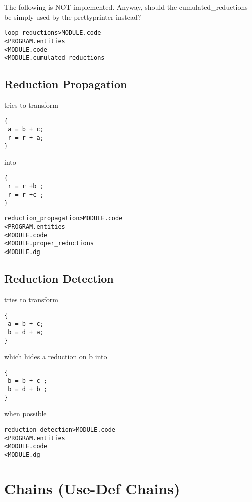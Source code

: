 \documentclass[a4paper]{report}
\newenvironment{PipsMake}{\begin{alltt}}{\end{alltt}}
\newenvironment{PipsPass}[1]{\label{pass:#1}}{}
\begin{document}
The following is NOT implemented. Anyway, should the cumulated\_reductions
be simply used by the prettyprinter instead?
\begin{PipsMake}
loop_reductions > MODULE.code
  < PROGRAM.entities
  < MODULE.code
  < MODULE.cumulated_reductions
\end{PipsMake}


\subsection{Reduction Propagation}
\begin{PipsPass}{reduction_propagation}
 tries to transform
 \begin{lstlisting}
{
 a = b + c;
 r = r + a;
}
 \end{lstlisting}
 into
 \begin{lstlisting}
{
 r = r +b ;
 r = r +c ;
}
 \end{lstlisting}
\end{PipsPass}
\begin{PipsMake}
reduction_propagation > MODULE.code
  < PROGRAM.entities
  < MODULE.code
  < MODULE.proper_reductions
  < MODULE.dg
\end{PipsMake}

\subsection{Reduction Detection}
\begin{PipsPass}{reduction_detection}
 tries to transform
 \begin{lstlisting}
{
 a = b + c;
 b = d + a;
}
 \end{lstlisting}
 which hides a reduction on b
 into
 \begin{lstlisting}
{
 b = b + c ;
 b = d + b ;
}
 \end{lstlisting}
 when possible
\end{PipsPass}

\begin{PipsMake}
reduction_detection > MODULE.code
  < PROGRAM.entities
  < MODULE.code
  < MODULE.dg
\end{PipsMake}

\section{Chains (Use-Def Chains)}
\label{subsection-chains}
\end{document}
